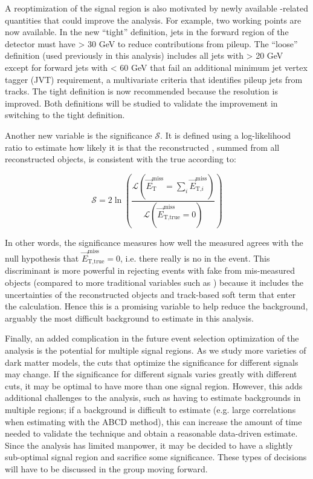 A reoptimization of the signal region is also motivated by newly available \etmiss-related quantities that could improve the \monoZ analysis. For example, two \etmiss working points are now available. In the new ``tight'' \etmiss definition, jets in the forward region of the detector must have \pt > 30 GeV to reduce contributions from pileup. The ``loose'' definition (used previously in this analysis) includes all jets with \pt > 20 GeV except for forward jets with \pt < 60 GeV that fail an additional minimum jet vertex tagger (JVT) requirement, a multivariate criteria that identifies pileup jets from tracks. The tight definition is now recommended because the \etmiss resolution is improved. Both definitions will be studied to validate the improvement in switching to the tight definition.

Another new variable is the \etmiss significance $\mathcal{S}$. It is defined using a log-likelihood ratio to estimate how likely it is that the reconstructed \etmissvec, summed from all reconstructed objects, is consistent with the true \etmissvec according to:

\begin{equation}
\mathcal{S} = 2 \ln \left( \frac{\mathcal{L}(\vec{E}_\text{T}^\text{miss} = \sum_i \vec{E}_{\text{T,}i}^\text{miss})}{\mathcal{L}(\vec{E}_\text{T,true}^\text{miss} = 0)} \right)
\end{equation}

\noindent In other words, the significance measures how well the measured \etmissvec agrees with the null hypothesis that $\vec{E}_\text{T,true}^\text{miss} = 0$, i.e. there really is no \etmiss in the event. This discriminant is more powerful in rejecting events with fake \etmiss from mis-measured objects (compared to more traditional variables such as \etmissht) because it includes the uncertainties of the reconstructed objects and track-based soft term that enter the \etmiss calculation. Hence this is a promising variable to help reduce the \Zjets background, arguably the most difficult background to estimate in this analysis.

Finally, an added complication in the future event selection optimization of the analysis is the potential for multiple signal regions. As we study more varieties of dark matter models, the cuts that optimize the significance for different signals may change. If the significance for different signals varies greatly with different cuts, it may be optimal to have more than one signal region. However, this adds additional challenges to the analysis, such as having to estimate backgrounds in multiple regions; if a background is difficult to estimate (e.g. large correlations when estimating \Zjets with the ABCD method), this can increase the amount of time needed to validate the technique and obtain a reasonable data-driven estimate. Since the analysis has limited manpower, it may be decided to have a slightly sub-optimal signal region and sacrifice some significance. These types of decisions will have to be discussed in the group moving forward.


